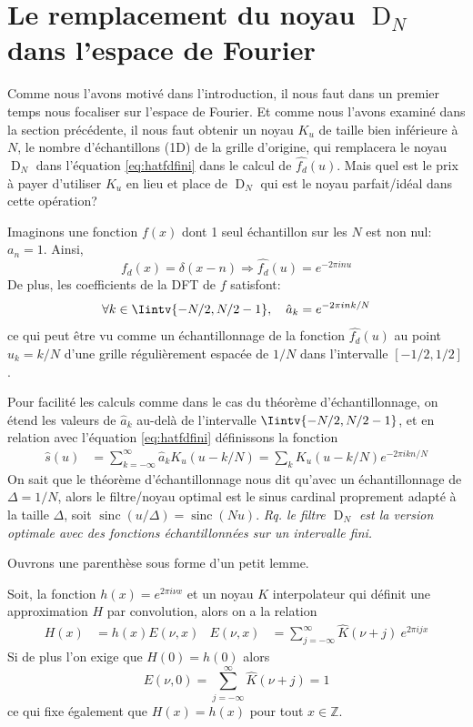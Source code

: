 \documentclass[11pt,twoside]{article}
\DeclareMathOperator{\sinc}{sinc}
\DeclareMathOperator{\D}{D}
\begin{document}
\section{Le remplacement du noyau $\D_N$ dans l'espace de Fourier}
\label{sec:DNapprox}
%
Comme nous l'avons motivé dans l'introduction, il nous faut dans un premier temps nous focaliser sur l'espace de Fourier. Et comme nous l'avons examiné dans la section précédente, il nous faut obtenir un noyau $K_u$ de taille bien inférieure à $N$, le nombre d'échantillons (1D) de la grille d'origine, qui remplacera le noyau $\D_N$ dans l'équation \ref{eq:hatfdfini} dans le calcul de $\hat{f_d}(u)$. Mais quel est le prix à payer d'utiliser $K_u$ en lieu et place de $\D_N$ qui est le noyau parfait/idéal dans cette opération?

Imaginons une fonction $f(x)$ dont 1 seul échantillon sur les $N$ est non nul: $a_n=1$. Ainsi, 
\begin{equation}
f_d(x) = \delta(x-n) \Rightarrow \hat{f_d}(u) = e^{-2\pi i n u}
\end{equation} 
De plus, les coefficients de la DFT de $f$ satisfont:
\begin{equation}
\forall k\in\Iintv{-N/2,N/2-1},\quad \hat{a}_k = e^{-2\pi i n k/N}
\end{equation}
ce qui peut être vu comme un échantillonnage de la fonction $\hat{f_d}(u)$ au point $u_k=k/N$ d'une grille régulièrement espacée de $1/N$ dans l'intervalle $[-1/2,1/2]$. 

Pour facilité les calculs comme dans le cas du théorème d'échantillonnage, on étend les valeurs de $ \hat{a}_k$ au-delà de l'intervalle $\Iintv{-N/2,N/2-1}$, et en relation avec l'équation \ref{eq:hatfdfini} définissons la fonction
\begin{align}
\hat{s}(u) &= \sum_{k=-\infty}^{\infty} \hat{a}_k K_u(u-k/N) = \sum_k K_u(u-k/N) e^{-2\pi i k n/N}
\label{eq:Su1}
\end{align}
On sait que le théorème d'échantillonnage nous dit qu'avec un échantillonnage de $\Delta=1/N$, alors le filtre/noyau optimal est le sinus cardinal proprement adapté à la taille $\Delta$, soit $\sinc(u/\Delta)=\sinc(Nu)$. \textit{Rq. le filtre $\D_N$ est la version optimale avec des fonctions échantillonnées sur un intervalle fini.}


Ouvrons une parenthèse sous forme d'un petit lemme. 
\begin{lemme}
Soit, la fonction  $h(x)=e^{2\pi i \nu x}$ et un noyau $K$ interpolateur qui définit une approximation $H$ par convolution, alors on a la relation
\begin{align} 
H(x) &= 	h(x) E(\nu,x) &  E(\nu,x)&=\sum_{j=-\infty}^\infty \hat{K}(\nu+j)\  e^{2\pi i jx}
\end{align}
Si de plus l'on exige que $H(0)=h(0)$ alors
\begin{equation}
E(\nu,0)=\sum_{j=-\infty}^\infty \hat{K}(\nu+j) = 1
\label{eq:hatKclosure}
\end{equation}
ce qui fixe également que $H(x)=h(x)$ pour tout $x\in\mathbb{Z}$.
\label{lem:interpSinusoide}
\end{lemme}
\end{document}
